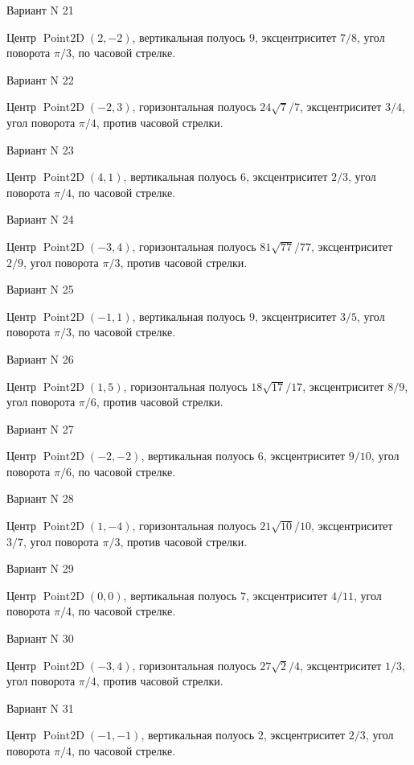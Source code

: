 \documentclass[11pt]{report}
\begin{document}
Вариант N 21

Центр $\operatorname{Point2D}\left(2, -2\right)$, вертикальная полуось $9$, эксцентриситет $7 / 8$, угол поворота $\pi / 3$, по часовой стрелке.

Вариант N 22

Центр $\operatorname{Point2D}\left(-2, 3\right)$, горизонтальная полуось $24 \sqrt{7} / 7$, эксцентриситет $3 / 4$, угол поворота $\pi / 4$, против часовой стрелки.

Вариант N 23

Центр $\operatorname{Point2D}\left(4, 1\right)$, вертикальная полуось $6$, эксцентриситет $2 / 3$, угол поворота $\pi / 4$, по часовой стрелке.

Вариант N 24

Центр $\operatorname{Point2D}\left(-3, 4\right)$, горизонтальная полуось $81 \sqrt{77} / 77$, эксцентриситет $2 / 9$, угол поворота $\pi / 3$, против часовой стрелки.

Вариант N 25

Центр $\operatorname{Point2D}\left(-1, 1\right)$, вертикальная полуось $9$, эксцентриситет $3 / 5$, угол поворота $\pi / 3$, по часовой стрелке.

Вариант N 26

Центр $\operatorname{Point2D}\left(1, 5\right)$, горизонтальная полуось $18 \sqrt{17} / 17$, эксцентриситет $8 / 9$, угол поворота $\pi / 6$, против часовой стрелки.

Вариант N 27

Центр $\operatorname{Point2D}\left(-2, -2\right)$, вертикальная полуось $6$, эксцентриситет $9 / 10$, угол поворота $\pi / 6$, по часовой стрелке.

Вариант N 28

Центр $\operatorname{Point2D}\left(1, -4\right)$, горизонтальная полуось $21 \sqrt{10} / 10$, эксцентриситет $3 / 7$, угол поворота $\pi / 3$, против часовой стрелки.

Вариант N 29

Центр $\operatorname{Point2D}\left(0, 0\right)$, вертикальная полуось $7$, эксцентриситет $4 / 11$, угол поворота $\pi / 4$, по часовой стрелке.

Вариант N 30

Центр $\operatorname{Point2D}\left(-3, 4\right)$, горизонтальная полуось $27 \sqrt{2} / 4$, эксцентриситет $1 / 3$, угол поворота $\pi / 4$, против часовой стрелки.

Вариант N 31

Центр $\operatorname{Point2D}\left(-1, -1\right)$, вертикальная полуось $2$, эксцентриситет $2 / 3$, угол поворота $\pi / 4$, по часовой стрелке.
\end{document}
